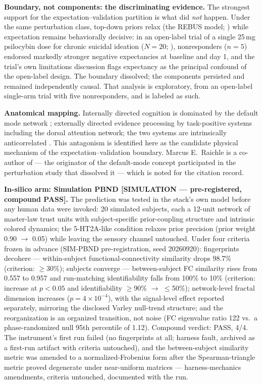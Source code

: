 \documentclass[
]{article}
\begin{document}
\textbf{Boundary, not components: the discriminating evidence.} The
strongest support for the expectation--validation partition is what did
\emph{not} happen. Under the same perturbation class, top-down priors
relax (the REBUS model; ) while expectation remains behaviorally
decisive: in an open-label trial of a single 25 mg psilocybin dose for
chronic suicidal ideation (\(N = 20\); ), nonresponders (\(n = 5\))
endorsed markedly stronger negative expectancies at baseline and day 1,
and the trial's own limitations discussion flags expectancy as the
principal confound of the open-label design. The boundary dissolved; the
components persisted and remained independently causal. That analysis is
exploratory, from an open-label single-arm trial with five
nonresponders, and is labeled as such.

\textbf{Anatomical mapping.} Internally directed cognition is dominated
by the default mode network ; externally directed evidence processing by
task-positive systems including the dorsal attention network; the two
systems are intrinsically anticorrelated . This antagonism is identified
here as the candidate physical mechanism of the expectation--validation
boundary. Marcus E.~Raichle is a co-author of --- the originator of the
default-mode concept participated in the perturbation study that
dissolved it --- which is noted for the citation record.

\textbf{In-silico arm: Simulation PBND {[}SIMULATION --- pre-registered,
compound PASS{]}.} The prediction was tested in the stack's own model
before any human data were invoked: 20 simulated subjects, each a
12-unit network of master-law trust units with subject-specific
prior-coupling structure and intrinsic colored dynamics; the 5-HT2A-like
condition relaxes prior precision (prior weight 0.90 \(\to\) 0.05) while
leaving the sensory channel untouched. Under four criteria frozen in
advance (SIM-PBND pre-registration, seed 20260920): fingerprints
decohere --- within-subject functional-connectivity similarity drops
98.7\% (criterion: \(\geq\)30\%); subjects converge --- between-subject
FC similarity rises from 0.557 to 0.957 and run-matching identifiability
falls from 100\% to 10\% (criterion: increase at \(p<0.05\) and
identifiability \(\geq\)90\% \(\to\) \(\leq\)50\%); network-level
fractal dimension increases (\(p = 4\times10^{-4}\)), with the
signal-level effect reported separately, mirroring the disclosed Varley
null-trend structure; and the reorganization is an organized transition,
not noise (FC eigenvalue ratio 122 vs.~a phase-randomized null 95th
percentile of 1.12). Compound verdict: PASS, 4/4. The instrument's first
run failed (no fingerprints at all; harness fault, archived as a
first-run artifact with criteria untouched), and the between-subject
similarity metric was amended to a normalized-Frobenius form after the
Spearman-triangle metric proved degenerate under near-uniform matrices
--- harness-mechanics amendments, criteria untouched, documented with
the run.
\end{document}
